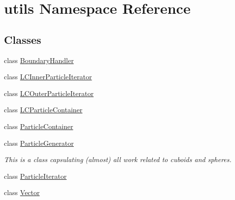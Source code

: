 \hypertarget{namespaceutils}{\section{utils Namespace Reference}
\label{namespaceutils}
}
\subsection*{Classes}
\begin{DoxyCompactItemize}
\item 
class \hyperlink{classutils_1_1BoundaryHandler}{Boundary\-Handler}
\item 
class \hyperlink{classutils_1_1LCInnerParticleIterator}{L\-C\-Inner\-Particle\-Iterator}
\item 
class \hyperlink{classutils_1_1LCOuterParticleIterator}{L\-C\-Outer\-Particle\-Iterator}
\item 
class \hyperlink{classutils_1_1LCParticleContainer}{L\-C\-Particle\-Container}
\item 
class \hyperlink{classutils_1_1ParticleContainer}{Particle\-Container}
\item 
class \hyperlink{classutils_1_1ParticleGenerator}{Particle\-Generator}
\begin{DoxyCompactList}\small\item\em This is a class capsulating (almost) all work related to cuboids and spheres. \end{DoxyCompactList}\item 
class \hyperlink{classutils_1_1ParticleIterator}{Particle\-Iterator}
\item 
class \hyperlink{classutils_1_1Vector}{Vector}
\end{DoxyCompactItemize}
